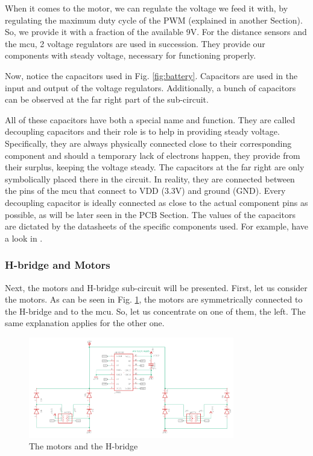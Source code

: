 \FloatBarrier

When it comes to the motor, we can regulate the voltage we feed it with, by regulating the maximum duty cycle of the PWM (explained in another Section). So, we provide it with a fraction of the available 9V.
For the distance sensors and the mcu, 2 voltage regulators are used in succession. They provide our components with steady voltage, necessary for functioning properly.

Now, notice the capacitors used in Fig. \ref{fig:battery}. Capacitors are used in the input and output of the voltage regulators. Additionally, a bunch of capacitors can be observed at the far right part of the sub-circuit.

All of these capacitors have both a special name and function. They are called decoupling capacitors and their role is to help in providing steady voltage. Specifically, they are always physically connected close to their corresponding component and should a temporary lack of electrons happen, they provide from their surplus, keeping the voltage steady.
The capacitors at the far right are only symbolically placed there in the circuit. In reality, they are connected between the pins of the mcu that connect to VDD (3.3V) and ground (GND). Every decoupling capacitor is ideally connected as close to the actual component pins as possible, as will be later seen in the PCB Section. The values of the capacitors are dictated by the datasheets of the specific components used. For example, have a look in \cite{mcu}.

\vspace{1cm}


\subsubsection{H-bridge and Motors}

Next, the motors and H-bridge sub-circuit will be presented. 
First, let us consider the motors. As can be seen in Fig. \ref{fig:motors}, the motors are symmetrically connected to the H-bridge and to the mcu. So, let us concentrate on one of them, the left. The same explanation applies for the other one.

\begin{figure}[htb]
    \centering
    \includegraphics[width=0.8\textwidth]{figures/hardware/MotorsandHBridge.PNG}
    \caption{The motors and the H-bridge}
    \label{fig:motors}
\end{figure}

